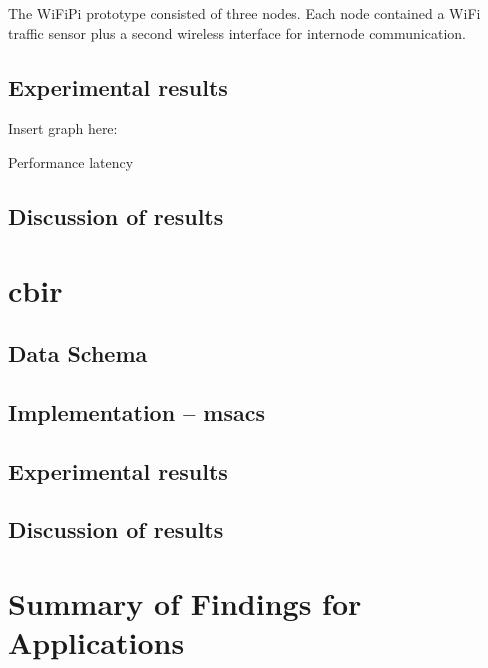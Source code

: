 The WiFiPi prototype consisted of three nodes.  Each node contained a WiFi traffic sensor plus a second wireless interface for internode communication.




\subsection{Experimental results}
Insert graph here:

Performance latency
\subsection{Discussion of results}
\section{\gls{cbir}}
\subsection{Data Schema}
\subsection{Implementation – \gls{msacs}}
\subsection{Experimental results}
\subsection{Discussion of results}
\section{Summary of Findings for Applications}
